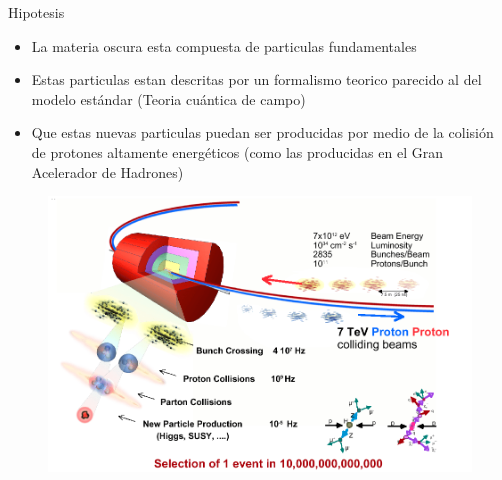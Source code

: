     
\begin{frame}{Hipotesis}

\begin{itemize}
    \item La materia oscura esta compuesta de particulas fundamentales 
    \item Estas particulas estan descritas por un formalismo teorico parecido al del modelo est\'andar (Teoria cu\'antica de campo) 
    \item Que estas nuevas particulas puedan ser producidas por medio de la colisi\'on de protones altamente energ\'eticos (como las producidas en el Gran Acelerador de Hadrones)
\end{itemize}

\begin{figure}
    \centering
    \includegraphics[scale=0.2]{Imag/sketch_collisions.png}
    \label{fig:my_label}
\end{figure}
    
\end{frame}



